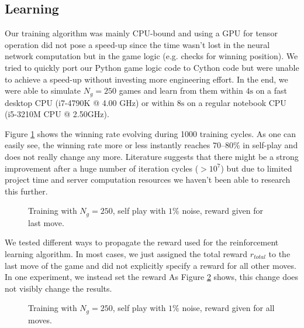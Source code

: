 \documentclass[10pt,twocolumn,letterpaper]{article}
\begin{document}
\subsection{Learning}
Our training algorithm was mainly CPU-bound and using a GPU for tensor
operation did not pose a speed-up since the time wasn't lost in the neural
network computation but in the game logic (e.g. checks for winning position).
We tried to quickly port our Python game logic code to Cython code but were
unable to achieve a speed-up without investing more engineering effort.
In the end, we were able to simulate $N_g = 250$ games and learn from
them within $4\mathrm{s}$ on a fast desktop CPU (i7-4790K @ 4.00 GHz)
or within $8 \mathrm{s}$ on a regular notebook CPU (i5-3210M CPU @ 2.50GHz).

Figure \ref{fig:last_move_self_001} shows the winning rate evolving during
1000 training cycles.
As one can easily see, the winning rate more or less
instantly reaches $70–80 \%$ in self-play and does not really change any more.
Literature suggests that there might be a strong improvement after a huge number of iteration cycles ($> 10^7$) but due to limited project time and server computation resources we haven't been able to research this further.

\begin{figure}[t]
    \begin{center}
		\noindent
		\makebox[3.25in]{
	   		
		}
	\end{center}
    \caption{Training with $N_g=250$, self play with $1\%$ noise, reward given for last move.}
	\label{fig:last_move_self_001}
\end{figure}
We tested different ways to propagate the reward used for the reinforcement learning algorithm.
In most cases, we just assigned the total reward $r_{total}$ to the last move of the game and did not explicitly specify a reward for all other moves.
In one experiment, we instead set the reward
As Figure \ref{fig:all_moves_self_001} shows, this change does not visibly change the results.
\begin{figure}[t]
    \begin{center}
		\noindent
		\makebox[3.25in]{
	   		
		}
	\end{center}
    \caption{Training with $N_g=250$, self play with $1\%$ noise, reward given for all moves.}
	\label{fig:all_moves_self_001}
\end{figure}
\end{document}
